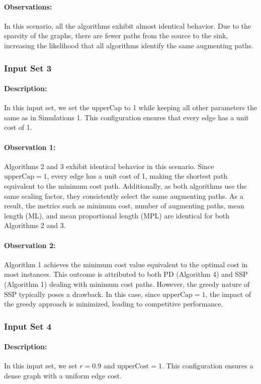 \documentclass{article}
\begin{document}
\paragraph{Observations:}
In this scenario, all the algorithms exhibit almost identical behavior. Due to the sparsity of the graphs, there are fewer paths from the source to the sink, increasing the likelihood that all algorithms identify the same augmenting paths.

\subsubsection{Input Set 3}
\paragraph{Description:}
In this input set, we set the \( \text{upperCap} \) to 1 while keeping all other parameters the same as in Simulations 1. This configuration ensures that every edge has a unit cost of 1.

\paragraph{Observation 1:}
Algorithms 2 and 3 exhibit identical behavior in this scenario. Since \( \text{upperCap} = 1 \), every edge has a unit cost of 1, making the shortest path equivalent to the minimum cost path. Additionally, as both algorithms use the same scaling factor, they consistently select the same augmenting paths. As a result, the metrics such as minimum cost, number of augmenting paths, mean length (ML), and mean proportional length (MPL) are identical for both Algorithms 2 and 3.

\paragraph{Observation 2:}
Algorithm 1 achieves the minimum cost value equivalent to the optimal cost in most instances. This outcome is attributed to both PD (Algorithm 4) and SSP (Algorithm 1) dealing with minimum cost paths. However, the greedy nature of SSP typically poses a drawback. In this case, since \( \text{upperCap} = 1 \), the impact of the greedy approach is minimized, leading to competitive performance.


\subsubsection{Input Set 4}
\paragraph{Description:}
In this input set, we set \( r = 0.9 \) and \( \text{upperCost} = 1 \). This configuration ensures a dense graph with a uniform edge cost.
\end{document}
